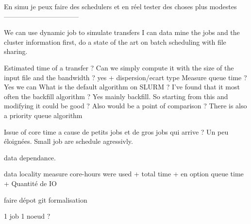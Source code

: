 \documentclass[a4paper]{article}
\begin{document}
En simu je peux faire des schedulers et en réel tester des choses plus modestes
---------------------------------

We can use dynamic job to simulate transfers
I can data mine the jobs and the cluster information first, do a state of the art on batch scheduling with file sharing.

Estimated time of a transfer ? Can we simply compute it with the size of the input file and the bandwidth ? yes + dispersion/ecart type
Measure queue time ? Yes we can
What is the default algorithm on SLURM ? I've found that it most often the backfill algorithm ? Yes mainly backfill. So starting from this and modifying it could be good ? Also would be a point of comparison ? There is also a priority queue algorithm

Issue of core time a cause de petits jobs et de gros jobs qui arrive ? Un peu éloignées. Small job are schedule agressivly.	

data dependance.

data locality
measure core-hours were used + total time + en option queue time + Quantité de IO

faire dépot git formalisation

1 job 1 noeud ?
\end{document}
